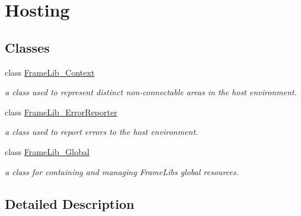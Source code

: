 \hypertarget{group___hosting}{}\section{Hosting}
\label{group___hosting}
\subsection*{Classes}
\begin{DoxyCompactItemize}
\item 
class \hyperlink{class_frame_lib___context}{Frame\+Lib\+\_\+\+Context}
\begin{DoxyCompactList}\small\item\em a class used to represent distinct non-\/connectable areas in the host environment. \end{DoxyCompactList}\item 
class \hyperlink{class_frame_lib___error_reporter}{Frame\+Lib\+\_\+\+Error\+Reporter}
\begin{DoxyCompactList}\small\item\em a class used to report errors to the host environment. \end{DoxyCompactList}\item 
class \hyperlink{class_frame_lib___global}{Frame\+Lib\+\_\+\+Global}
\begin{DoxyCompactList}\small\item\em a class for containing and managing Frame\+Lib\textquotesingle{}s global resources. \end{DoxyCompactList}\end{DoxyCompactItemize}


\subsection{Detailed Description}
